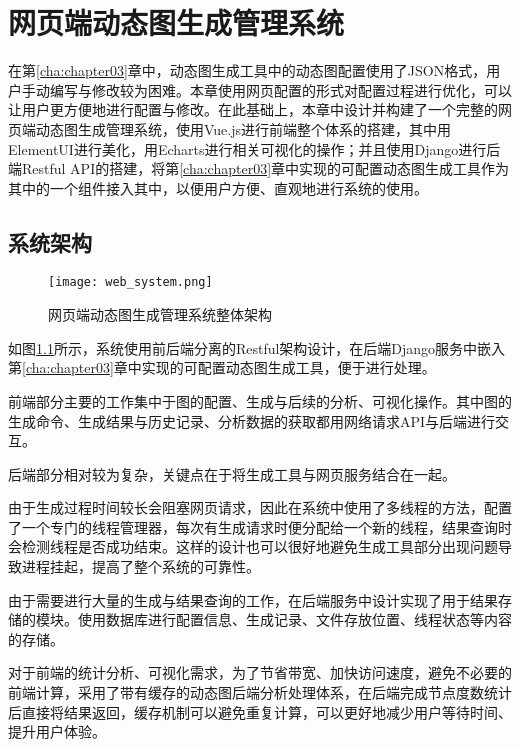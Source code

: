 
\chapter{网页端动态图生成管理系统}
\label{cha:chapter04}

在第\ref{cha:chapter03}章中，动态图生成工具中的动态图配置使用了JSON格式，用户手动编写与修改较为困难。本章使用网页配置的形式对配置过程进行优化，可以让用户更方便地进行配置与修改。在此基础上，本章中设计并构建了一个完整的网页端动态图生成管理系统，使用Vue.js进行前端整个体系的搭建，其中用ElementUI进行美化，用Echarts进行相关可视化的操作；并且使用Django进行后端Restful API的搭建，将第\ref{cha:chapter03}章中实现的可配置动态图生成工具作为其中的一个组件接入其中，以便用户方便、直观地进行系统的使用。

\section{系统架构}

\begin{figure}
  \centering
  \texttt{[image: web\_system.png]}
  \caption{网页端动态图生成管理系统整体架构}
  \label{fig:web_system}
\end{figure}

如图\ref{fig:web_system}所示，系统使用前后端分离的Restful架构设计，在后端Django服务中嵌入第\ref{cha:chapter03}章中实现的可配置动态图生成工具，便于进行处理。

前端部分主要的工作集中于图的配置、生成与后续的分析、可视化操作。其中图的生成命令、生成结果与历史记录、分析数据的获取都用网络请求API与后端进行交互。

后端部分相对较为复杂，关键点在于将生成工具与网页服务结合在一起。

由于生成过程时间较长会阻塞网页请求，因此在系统中使用了多线程的方法，配置了一个专门的线程管理器，每次有生成请求时便分配给一个新的线程，结果查询时会检测线程是否成功结束。这样的设计也可以很好地避免生成工具部分出现问题导致进程挂起，提高了整个系统的可靠性。

由于需要进行大量的生成与结果查询的工作，在后端服务中设计实现了用于结果存储的模块。使用数据库进行配置信息、生成记录、文件存放位置、线程状态等内容的存储。

对于前端的统计分析、可视化需求，为了节省带宽、加快访问速度，避免不必要的前端计算，采用了带有缓存的动态图后端分析处理体系，在后端完成节点度数统计后直接将结果返回，缓存机制可以避免重复计算，可以更好地减少用户等待时间、提升用户体验。

